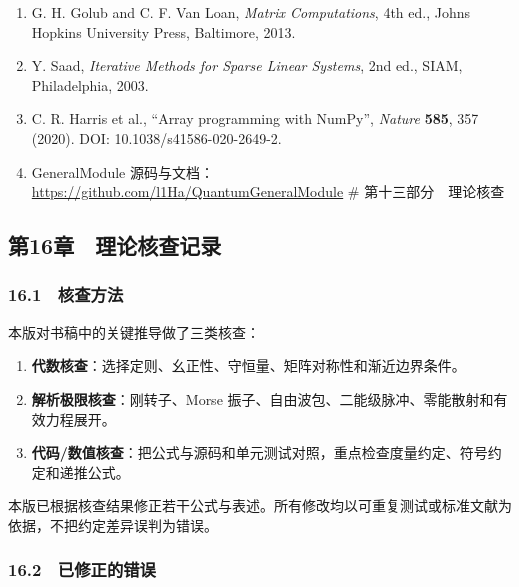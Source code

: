 \documentclass[
]{ctexbook}
\providecommand{\tightlist}{%
  \setlength{\itemsep}{0pt}\setlength{\parskip}{0pt}}
\let\origsubsection\subsection
\renewcommand{\subsection}[1]{%
  \needspace{6\baselineskip}%
  \origsubsection{#1}%
}
\begin{document}
\begin{enumerate}
\def\labelenumi{\arabic{enumi}.}
\tightlist
\item
  G. H. Golub and C. F. Van Loan, \emph{Matrix Computations}, 4th ed.,
  Johns Hopkins University Press, Baltimore, 2013.
\item
  Y. Saad, \emph{Iterative Methods for Sparse Linear Systems}, 2nd ed.,
  SIAM, Philadelphia, 2003.
\item
  C. R. Harris et al., ``Array programming with NumPy'', \emph{Nature}
  \textbf{585}, 357 (2020). DOI: 10.1038/s41586-020-2649-2.
\item
  GeneralModule
  源码与文档：\url{https://github.com/l1Ha/QuantumGeneralModule} \#
  第十三部分　理论核查
\end{enumerate}

\hypertarget{ux7b2c16ux7ae0-ux7406ux8bbaux6838ux67e5ux8bb0ux5f55}{%
\subsection{第16章　理论核查记录}\label{ux7b2c16ux7ae0-ux7406ux8bbaux6838ux67e5ux8bb0ux5f55}}

\hypertarget{ux6838ux67e5ux65b9ux6cd5}{%
\subsubsection{16.1　核查方法}\label{ux6838ux67e5ux65b9ux6cd5}}

本版对书稿中的关键推导做了三类核查：

\begin{enumerate}
\def\labelenumi{\arabic{enumi}.}
\tightlist
\item
  \textbf{代数核查}：选择定则、幺正性、守恒量、矩阵对称性和渐近边界条件。
\item
  \textbf{解析极限核查}：刚转子、Morse
  振子、自由波包、二能级脉冲、零能散射和有效力程展开。
\item
  \textbf{代码/数值核查}：把公式与源码和单元测试对照，重点检查度量约定、符号约定和递推公式。
\end{enumerate}

本版已根据核查结果修正若干公式与表述。所有修改均以可重复测试或标准文献为依据，不把约定差异误判为错误。

\hypertarget{ux5df2ux4feeux6b63ux7684ux9519ux8bef}{%
\subsubsection{16.2　已修正的错误}\label{ux5df2ux4feeux6b63ux7684ux9519ux8bef}}
\end{document}

